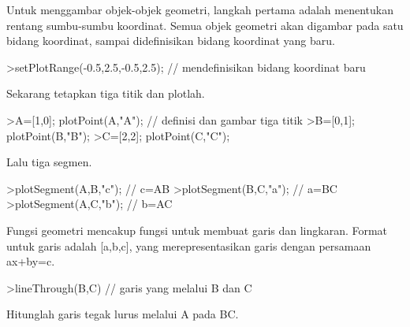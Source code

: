 \documentclass[a4paper,10pt]{article}
\begin{document}
\begin{eulernotebook}
\begin{eulercomment}
\begin{eulercomment}
\begin{eulercomment}
\begin{eulercomment}
\begin{eulercomment}
\begin{eulercomment}
\begin{eulercomment}
\begin{eulercomment}
\begin{eulercomment}
\begin{eulercomment}
\begin{eulercomment}
\begin{eulercomment}
\begin{eulercomment}
\begin{eulercomment}
\begin{eulercomment}
\begin{eulercomment}
\begin{eulercomment}
\begin{eulercomment}
\begin{eulercomment}
\begin{eulercomment}
\begin{eulercomment}
\begin{eulercomment}
\begin{eulercomment}
\begin{eulercomment}
\begin{eulercomment}
\begin{eulercomment}
\begin{eulercomment}
\begin{eulercomment}
\begin{eulercomment}
\begin{eulercomment}
\begin{eulercomment}
\end{eulercomment}
\begin{eulercomment}
Untuk menggambar objek-objek geometri, langkah pertama adalah menentukan rentang sumbu-sumbu
koordinat. Semua objek geometri akan digambar pada satu bidang koordinat, sampai didefinisikan
bidang koordinat yang baru.
\end{eulercomment}
\begin{eulerprompt}
>setPlotRange(-0.5,2.5,-0.5,2.5); // mendefinisikan bidang koordinat baru 
\end{eulerprompt}
\begin{eulercomment}
Sekarang tetapkan tiga titik dan plotlah.
\end{eulercomment}
\begin{eulerprompt}
>A=[1,0]; plotPoint(A,"A"); // definisi dan gambar tiga titik
>B=[0,1]; plotPoint(B,"B");
>C=[2,2]; plotPoint(C,"C");
\end{eulerprompt}
\begin{eulercomment}
Lalu tiga segmen.
\end{eulercomment}
\begin{eulerprompt}
>plotSegment(A,B,"c"); // c=AB
>plotSegment(B,C,"a"); // a=BC
>plotSegment(A,C,"b"); // b=AC
\end{eulerprompt}
\begin{eulercomment}
Fungsi geometri mencakup fungsi untuk membuat garis dan lingkaran.
Format untuk garis adalah [a,b,c], yang merepresentasikan garis dengan
persamaan ax+by=c.
\end{eulercomment}
\begin{eulerprompt}
>lineThrough(B,C) // garis yang melalui B dan C
\end{eulerprompt}
\begin{euleroutput}
  [-1,  2,  2]
\end{euleroutput}
\begin{eulercomment}
Hitunglah garis tegak lurus melalui A pada BC.

\end{eulercomment}
\end{eulercomment}
\end{eulercomment}
\end{eulercomment}
\end{eulercomment}
\end{eulercomment}
\end{eulercomment}
\end{eulercomment}
\end{eulercomment}
\end{eulercomment}
\end{eulercomment}
\end{eulercomment}
\end{eulercomment}
\end{eulercomment}
\end{eulercomment}
\end{eulercomment}
\end{eulercomment}
\end{eulercomment}
\end{eulercomment}
\end{eulercomment}
\end{eulercomment}
\end{eulercomment}
\end{eulercomment}
\end{eulercomment}
\end{eulercomment}
\end{eulercomment}
\end{eulercomment}
\end{eulercomment}
\end{eulercomment}
\end{eulercomment}
\end{eulercomment}
\end{eulernotebook}
\end{document}
